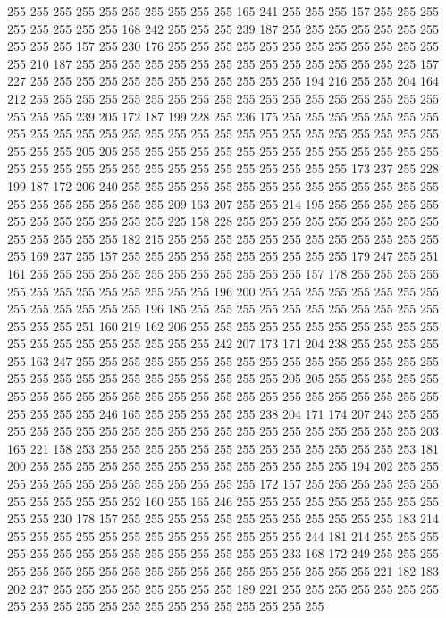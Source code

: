 255 255 255 255 255 255 255 255 255 255 165 241 255 255 255 157 255 255 255 255
255 255 255 255 168 242 255 255 255 239 187 255 255 255 255 255 255 255 255 255
255 157 255 230 176 255 255 255 255 255 255 255 255 255 255 255 255 255 210 187
255 255 255 255 255 255 255 255 255 255 255 255 255 255 225 157 227 255 255 255
255 255 255 255 255 255 255 255 255 194 216 255 255 204 164 212 255 255 255 255
255 255 255 255 255 255 255 255 255 255 255 255 255 255 255 255 255 239 205 172
187 199 228 255 236 175 255 255 255 255 255 255 255 255 255 255 255 255 255 255
255 255 255 255 255 255 255 255 255 255 255 255 255 255 255 205 205 255 255 255
255 255 255 255 255 255 255 255 255 255 255 255 255 255 255 255 255 255 255 255
255 255 255 255 255 255 173 237 255 228 199 187 172 206 240 255 255 255 255 255
255 255 255 255 255 255 255 255 255 255 255 255 255 255 255 255 209 163 207 255
255 214 195 255 255 255 255 255 255 255 255 255 255 255 255 225 158 228 255 255
255 255 255 255 255 255 255 255 255 255 255 255 182 215 255 255 255 255 255 255
255 255 255 255 255 255 255 169 237 255 157 255 255 255 255 255 255 255 255 255
255 179 247 255 251 161 255 255 255 255 255 255 255 255 255 255 255 255 157 178
255 255 255 255 255 255 255 255 255 255 255 255 255 196 200 255 255 255 255 255
255 255 255 255 255 255 255 255 255 196 185 255 255 255 255 255 255 255 255 255
255 255 255 255 255 251 160 219 162 206 255 255 255 255 255 255 255 255 255 255
255 255 255 255 255 255 255 255 255 255 242 207 173 171 204 238 255 255 255 255
255 163 247 255 255 255 255 255 255 255 255 255 255 255 255 255 255 255 255 255
255 255 255 255 255 255 255 255 255 255 255 205 205 255 255 255 255 255 255 255
255 255 255 255 255 255 255 255 255 255 255 255 255 255 255 255 255 255 255 255
255 246 165 255 255 255 255 255 238 204 171 174 207 243 255 255 255 255 255 255
255 255 255 255 255 255 255 255 255 255 255 255 255 255 203 165 221 158 253 255
255 255 255 255 255 255 255 255 255 255 255 255 253 181 200 255 255 255 255 255
255 255 255 255 255 255 255 255 255 194 202 255 255 255 255 255 255 255 255 255
255 255 255 255 172 157 255 255 255 255 255 255 255 255 255 255 255 252 160 255
165 246 255 255 255 255 255 255 255 255 255 255 255 230 178 157 255 255 255 255
255 255 255 255 255 255 255 255 183 214 255 255 255 255 255 255 255 255 255 255
255 255 255 244 181 214 255 255 255 255 255 255 255 255 255 255 255 255 255 255
255 233 168 172 249 255 255 255 255 255 255 255 255 255 255 255 255 255 255 255
255 255 255 255 221 182 183 202 237 255 255 255 255 255 255 255 255 189 221 255
255 255 255 255 255 255 255 255 255 255 255 255 255 255 255 255 255 255 255 255
